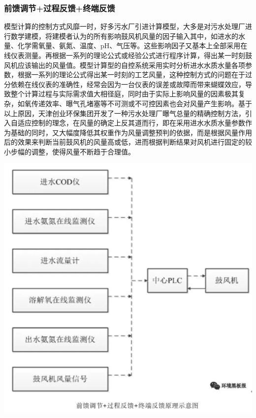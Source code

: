 \documentclass[]{book}
\begin{document}
\hypertarget{ux524dux9988ux8c03ux8282ux8fc7ux7a0bux53cdux9988ux7ec8ux7aefux53cdux9988}{%
\subsubsection{前馈调节+过程反馈+终端反馈}\label{ux524dux9988ux8c03ux8282ux8fc7ux7a0bux53cdux9988ux7ec8ux7aefux53cdux9988}}

模型计算的控制方式风靡一时，好多污水厂引进计算模型，大多是对污水处理厂进行数学建模，将建模者认为的所有影响鼓风机风量的因子输入其中，如进水的水量、化学需氧量、氨氮、温度、pH、气压等。这些影响因子又基本上全部采用在线仪表测量。再根据一系列的理论公式或经验公式进行程序计算，得出某一时刻鼓风机应该输出的风量值。模型计算型的自控系统采用实时分析进水水质水量各项参数，根据一系列的理论公式得出某一时刻的工艺风量，这种控制方式的问题在于过分依赖在线仪表的准确性，经常会因为一台仪表的误差或故障而带来蝴蝶效应，导致整个计算过程与实际需求值大相径庭，同时由于实际上影响风量的因素极其复杂，如氧传递效率、曝气孔堵塞等不可测或不可控因素也会对风量产生影响。基于以上原因，天津创业环保集团开发了一种污水处理厂曝气总量的精确控制方法，引入自适应控制的理念，在风量的确定上反其道而行，即在采用进水水质水量参数作为基础的同时，又大幅度降低其权重作为风量调整预判的依据，而是根据风量作用后的效果来判断当前鼓风机的风量高或低，进而根据判断结果对风机进行固定的较小步幅的调整，使得风量不断趋于合理值。

\includegraphics[width=8.24in]{images/bq6}
\end{document}
